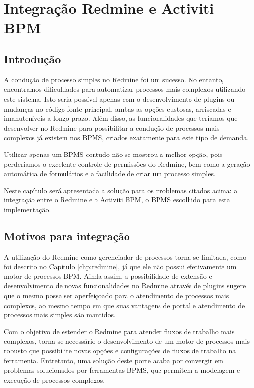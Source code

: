 \chapter{Integração Redmine e Activiti BPM}\label{chp:integracao_redmine_activiti}

\section{Introdução}\label{sec:integracao_intro}

A condução de processo simples no Redmine foi um sucesso. No entanto, encontramos dificuldades para automatizar processos mais complexos utilizando este sistema. Isto seria possível apenas com o desenvolvimento de plugins ou mudanças no código-fonte principal, ambas as opções custosas, arriscadas e imanuteníveis a longo prazo. Além disso, as funcionalidades que teríamos que desenvolver no Redmine para possibilitar a condução de processos mais complexos já existem nos BPMS, criados exatamente para este tipo de demanda. 

Utilizar apenas um BPMS contudo não se mostrou a melhor opção, pois perderíamos o excelente controle de permissões do Redmine, bem como a geração automática de formulários e a facilidade de criar um processo simples. 

Neste capítulo será apresentada a solução para os problemas citados acima: a integração entre o Redmine e o Activiti BPM, o BPMS escolhido para esta implementação.

\section{Motivos para integração}\label{sec:cenario-integracao}

A utilização do Redmine como gerenciador de processos torna-se limitada, como foi descrito no Capítulo \ref{chp:redmine}, já que ele não possui efetivamente um motor de processos BPM. Ainda assim, a possibilidade de extensão e desenvolvimento de novas funcionalidades no Redmine através de plugins sugere que o mesmo possa ser aperfeiçoado para o atendimento de processos mais complexos, ao mesmo tempo em que suas vantagens de portal e atendimento de processos mais simples são mantidos.

Com o objetivo de estender o Redmine para atender fluxos de trabalho mais complexos, torna-se necessário o desenvolvimento de um motor de processos mais robusto que possibilite novas opções e configurações de fluxos de trabalho na ferramenta. Entretanto, uma solução deste porte acaba por convergir em problemas solucionados por ferramentas BPMS, que permitem a modelagem e execução de processos complexos.

